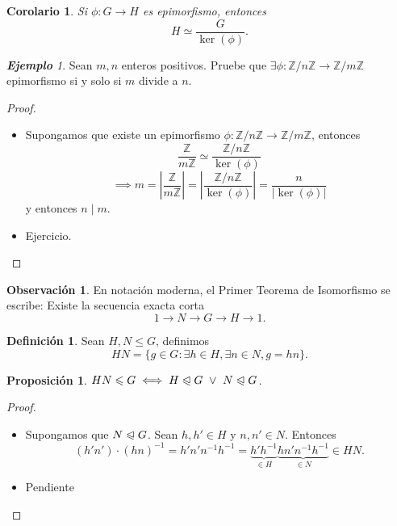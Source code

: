 \documentclass{article}
\newtheorem{corollary}[theorem]{Corolario}
\newtheorem{proposition}[theorem]{Proposición}
\theoremstyle{definition}
\newtheorem{definition}[theorem]{Definición}
\newtheorem*{obs}{Observación}
\theoremstyle{remark}
\newtheorem{example}[theorem]{\textbf{Ejemplo}}
\numberwithin{equation}{section}
\newcommand{\Z}{\mathbb{Z}}
\renewcommand{\c}{\cdot}
\newcommand{\normal}{\trianglelefteqslant}
\newcommand{\abs}[1]{\left| #1 \right|}
\newcommand{\znz}[1]{\frac{\Z}{#1 \Z}}
\newcommand{\zmz}[1]{\Z/ #1 \Z}
\newcommand{\rac}[2]{\frac{#1}{#2}}
\begin{document}
\begin{corollary}
  Si $\phi \colon G \to H$ es epimorfismo, entonces $$H \simeq \rac{G}{\ker(\phi)}.$$
\end{corollary}

\begin{example}
  Sean $m,n$ enteros positivos. Pruebe que $\exists \phi \colon \zmz n \to \zmz m$ epimorfismo si y solo si $m$ divide a $n$.
\end{example}
\begin{proof}\
  \begin{itemize}
    \item[\boxed{\implies}] Supongamos que existe un epimorfismo $\phi \colon \zmz n \to \zmz m$, entonces
    \[\znz m \simeq \frac{\zmz n}{\ker(\phi)}\]
    \[\implies m
    = \abs{\znz m}
    = \abs{ \frac{\zmz n}{\ker(\phi)} }
    = \frac{n}{\abs{\ker(\phi)}}\]
    y entonces $n \mid m$.

    \item[\boxed{\impliedby}] Ejercicio. %
  \end{itemize}
\end{proof}

\begin{obs}
  En notación moderna, el Primer Teorema de Isomorfismo se escribe: Existe la secuencia exacta corta
  \[1 \to N \to G \to H \to 1.\] %
\end{obs}

\begin{definition}
  Sean $H,N \leqslant G$, definimos
  \[HN = \{g \in G \colon \exists h \in H, \exists n \in N, g = hn\}.\]
\end{definition}

\begin{proposition}
  $HN \leqslant G \iff H \normal G \ \lor\ N \normal G$.
\end{proposition}
\begin{proof}
  \
  \begin{itemize}
    \item[\boxed{\impliedby}]
    Supongamos que $N \normal G$. Sean $h,h' \in H$ y $n,n' \in N$. Entonces
    \[(h'n') \c (hn)^{-1}
    = h' n' n^{-1} h^{-1}
    = \underbrace{h' h^{-1}}_{\in H} \underbrace{h n' n^{-1} h^{-1}}_{\in N} \in HN.\]
    \item[\boxed{\implies}] Pendiente %
  \end{itemize}
\end{proof}
\end{document}
